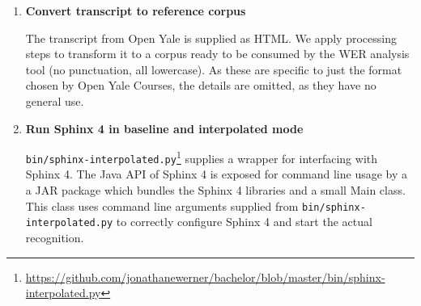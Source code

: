 \documentclass[]{article}
\providecommand{\tightlist}{%
  \setlength{\itemsep}{0pt}\setlength{\parskip}{0pt}}
\begin{document}
\begin{enumerate}
  \begin{itemize}
  \tightlist
  \item
    \texttt{pdftohtml\ -i\ -xml} is applied on the given material PDF.
    The XML output representation is input to
    \texttt{pdfreflow}\footnote{pdftohtml and pdfreflow are open source
      linux command line utilities}. Compared to the tool
    \texttt{pdftotext} the combination of these 2 tools preserves
    paragraphs correctly, whereas \texttt{pdftotext} represents each
    line break in the input PDF as a new paragraph in the output text
    file. This is a significant disadvantage for the LM creation step,
    as a newline in the input file there has the semantic ``end of
    sentence'' -- so that a sentence split into 4 lines by
    \texttt{pdftotext} would count as 4 sentences in the LM.
  \item
    The HTML output from \texttt{pdfreflow} is filtered by taking only
    relevant HTML-tags such as \texttt{\textless{}p\textgreater{}}'s
    (paragraphs) and \texttt{\textless{}blockquote\textgreater{}}'s,
    further improving the content-to-noise ratio.
  \item
    The resulting text is then preprocessed for optimal compatibility
    with the LM creation tool by removing punctuation and superfluous
    whitespace\footnote{I use a combination of command line text
      processing (sed) and a perl script from Stephen Marquard here.}.
  \item
    The resulting corpus is input to \texttt{estimate-ngram}, a LM
    creation tool from the MIT Language Modeling Toolkit\footnote{\url{https://code.google.com/p/mitlm/wiki/EstimateNgram}}
    (MITLMT).
  \end{itemize}
\item
  \textbf{Convert transcript to reference corpus}

  The transcript from Open Yale is supplied as HTML. We apply processing
  steps to transform it to a corpus ready to be consumed by the WER
  analysis tool (no punctuation, all lowercase). As these are specific
  to just the format chosen by Open Yale Courses, the details are
  omitted, as they have no general use.
\item
  \textbf{Run Sphinx 4 in baseline and interpolated mode}

  \texttt{bin/sphinx-interpolated.py}\footnote{\url{https://github.com/jonathanewerner/bachelor/blob/master/bin/sphinx-interpolated.py}}
  supplies a wrapper for interfacing with Sphinx 4. The Java API of
  Sphinx 4 is exposed for command line usage by a a JAR package which
  bundles the Sphinx 4 libraries and a small Main class. This class uses
  command line arguments supplied from
  \texttt{bin/sphinx-interpolated.py} to correctly configure Sphinx 4
  and start the actual recognition.


\end{enumerate}
\end{document}
